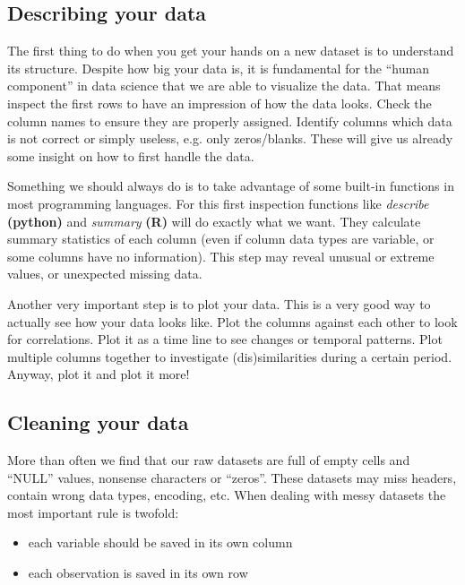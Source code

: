 \subsection{Describing your data}\label{Analy.1}

The first thing to do when you get your hands on a new dataset is to understand its structure. Despite how big your data is, it is fundamental for the ``human component'' in data science that we are able to visualize the data. That means inspect the first rows to have an impression of how the data looks. Check the column names to ensure they are properly assigned. Identify columns which data is not correct or simply useless, e.g. only zeros/blanks. These will give us already some insight on how to first handle the data. 

Something we should always do is to take advantage of some built-in functions in most programming languages. For this first inspection functions like \textit{describe} \textbf{(python)} and \textit{summary} \textbf{(R)} will do exactly what we want. They calculate summary statistics of each column (even if column data types are variable, or some columns have no information). This step may reveal unusual or extreme values, or unexpected missing data.

Another very important step is to plot your data. This is a very good way to actually see how your data looks like. Plot the columns against each other to look for correlations. Plot it as a time line to see changes or temporal patterns. Plot multiple columns together to investigate (dis)similarities during a certain period. Anyway, plot it and plot it more!

\subsection{Cleaning your data}\label{Analy.2}

More than often we find that our raw datasets are full of empty cells and ``NULL'' values, nonsense characters or ``zeros''. These datasets may miss headers, contain wrong data types, encoding, etc. When dealing with messy datasets the most important rule is twofold:

\begin{itemize}
\item each variable should be saved in its own column
\item each observation is saved in its own row
\end{itemize}

